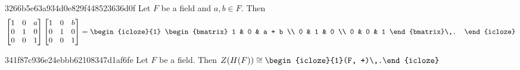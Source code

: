 \begin{note}{3266b5e63a934d0e829f448523636d0f}
    Let \({ F }\) be a field and \({ a, b \in F }\).
    Then
    \[
            \begin{bmatrix}
                1 & 0 & a \\
                0 & 1 & 0 \\
                0 & 0 & 1
            \end{bmatrix}
            \begin{bmatrix}
                1 & 0 & b \\
                0 & 1 & 0 \\
                0 & 0 & 1
            \end{bmatrix}
            =
            \begin{icloze}{1}
                \begin{bmatrix}
                    1 & 0 & a + b \\
                    0 & 1 & 0 \\
                    0 & 0 & 1
                \end{bmatrix}\,.
            \end{icloze}
    \]
\end{note}

\begin{note}{341f87c936e24ebbb62108347d1af6fe}
    Let \({ F }\) be a field.
    Then \({ Z(H(F)) \cong \begin{icloze}{1}(F, +)\,.\end{icloze} }\)
\end{note}


